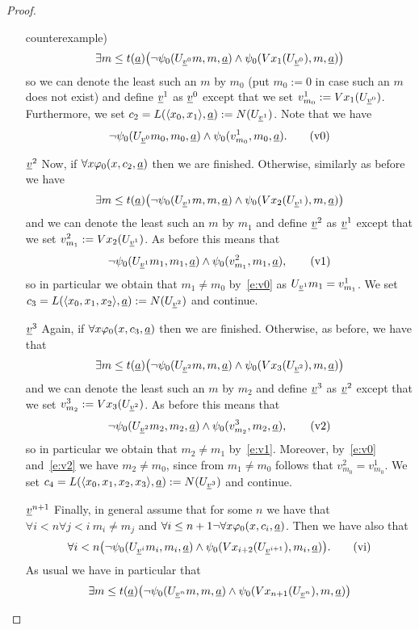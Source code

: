 \begin{proof}
\begin{enumerate}
counterexample) 
\[
\exists m\leq t(\underline a) \big (\neg\psi_0(U_{\underline v^0}m,m,\underline a) \wedge \psi_0(Vx_1(U_{\underline v^0}),m,\underline a)\big)
\]
so we can denote the least such an $m$ by $m_0$ (put $m_0:=0$ in case such an 
$m$ does not exist) and define $\underline v^1$ as $\underline v^0$ except that we set $v^1_{m_0}:=Vx_1(U_{\underline v^0})$.
Furthermore, we set 
$c_2=L(\langle x_0,x_1\rangle,\underline a):=N(U_{\underline v^1})$. 
Note that we have \[ \neg\psi_0(U_{\underline v^0}m_0,m_0,\underline a) \wedge \psi_0(v^1_{m_0},m_0,\underline a). \tag{v0}\label{e:v0}\]
\item[$\underline v^2$] Now, if $\forall x \varphi_0(x,c_2,\underline a)$ then we are finished. Otherwise, similarly as before we have 
\[
\exists m\leq t(\underline a) \big (\neg\psi_0(U_{\underline v^1}m,m,\underline a) \wedge \psi_0(Vx_2(U_{\underline v^1}),m,\underline a)\big)
\]
and we can denote the least such an $m$ by $m_1$ and define $\underline v^2$ as $\underline v^1$ except that we set $v^2_{m_1}:=Vx_2(U_{\underline v^1})$. As before this means that
\[ \neg\psi_0(U_{\underline v^1}m_1,m_1,\underline a) \wedge \psi_0(v^2_{m_1},m_1,\underline a), \tag{v1}\label{e:v1}\]
so in particular we obtain that $m_1\neq m_0$ by~\eqref{e:v0} as $U_{\underline v^1}m_1=v^1_{m_1}$. We set $c_3=L(\langle x_0,x_1,x_2\rangle,\underline a):=
N(U_{\underline v^2})$ and continue.
\item[$\underline v^3$] Again, if $\forall x \varphi_0(x,c_3,\underline a)$ then we are finished. Otherwise, as before, we have that
\[
\exists m\leq t(\underline a) \big (\neg\psi_0(U_{\underline v^2}m,m,\underline a) \wedge \psi_0(Vx_3(U_{\underline v^2}),m,\underline a)\big)
\]
and we can denote the least such an $m$ by $m_2$ and define $\underline v^3$ as $\underline v^2$ except that we set $v^3_{m_2}:=Vx_3(U_{\underline v^2})$. As before this means that
\[ \neg\psi_0(U_{\underline v^2}m_2,m_2,\underline a) \wedge \psi_0(v^3_{m_2},m_2,\underline a), \tag{v2}\label{e:v2}\]
so in particular we obtain that $m_2\neq m_1$ by~\eqref{e:v1}. Moreover, by~\eqref{e:v0} and~\eqref{e:v2} we have $m_2\neq m_0$, since from $m_1\neq m_0$ follows that $v^2_{m_0}=v^1_{m_0}$.
 We set $c_4=L(\langle x_0,x_1,x_2,x_3\rangle,\underline a):=N(U_{\underline v^3})$ and continue.\\
\item[$\underline v^{n+1}$] Finally, in general assume that for some $n$ we have that $\forall i< n\forall j<i\ m_i\neq m_j$
 and $\forall i\leq n+1 \neg \forall x \varphi_0(x,c_i,\underline a)$.
Then we have also that
\[ 
\forall i<n \big (\neg\psi_0(U_{\underline v^i}m_i,m_i,\underline a) \wedge \psi_0(Vx_{i+2}(U_{\underline v^{i+1}}),m_i,\underline a)\big). \tag{vi}\label{e:vi}
\]
As usual we have in particular that
\[ 
\exists m\leq t(\underline a) \big (\neg\psi_0(U_{\underline v^n}m,m,\underline a) \wedge \psi_0(Vx_{n+1}(U_{\underline v^n}),m,\underline a)\big)
\]
\end{enumerate}
\end{proof}
